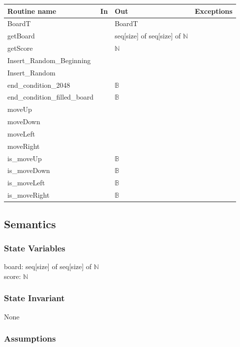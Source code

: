\documentclass[12pt]{article}
\begin{document}
\begin{tabular}{| l | l | l | l |}
\hline
\textbf{Routine name} & \textbf{In} & \textbf{Out} & \textbf{Exceptions}\\
\hline
BoardT & ~ & BoardT & \\
\hline
getBoard & ~ & seq[size] of seq[size] of $\mathbb{N}$  & \\
\hline
getScore & ~ & $\mathbb{N}$ & \\
\hline
Insert\_Random\_Beginning & ~ & ~ & \\
\hline
Insert\_Random & ~ & ~ & \\
\hline
end\_condition\_2048 & ~ & $\mathbb{B}$ & \\
\hline
end\_condition\_filled\_board & ~ & $\mathbb{B}$ & \\
\hline
moveUp & ~ & ~ & \\
\hline
moveDown & ~ & ~ & \\
\hline
moveLeft & ~ & ~ & \\
\hline
moveRight & ~ & ~ & \\
\hline
is\_moveUp & ~ & $\mathbb{B}$ & \\
\hline
is\_moveDown & ~ & $\mathbb{B}$ & \\
\hline
is\_moveLeft & ~ & $\mathbb{B}$ & \\
\hline
is\_moveRight & ~ & $\mathbb{B}$ & \\
\hline
\end{tabular}

\subsection* {Semantics}

\subsubsection* {State Variables}

board: seq[size] of seq[size] of $\mathbb{N}$ \\
score: $\mathbb{N}$

\subsubsection* {State Invariant}

None

\subsubsection* {Assumptions}
\end{document}
